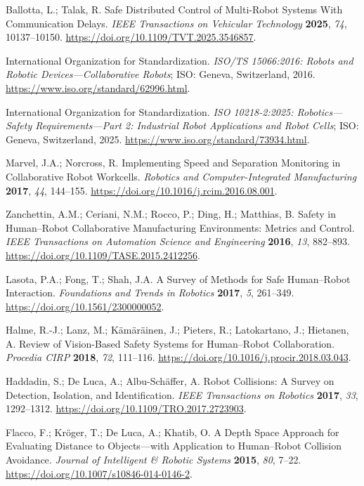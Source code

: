  Ballotta, L.; Talak, R. Safe Distributed Control of Multi-Robot Systems With Communication Delays. \emph{IEEE Transactions on Vehicular Technology} \textbf{2025}, \emph{74}, 10137--10150. \url{https://doi.org/10.1109/TVT.2025.3546857}.

 International Organization for Standardization. \emph{ISO/TS 15066:2016: Robots and Robotic Devices---Collaborative Robots}; ISO: Geneva, Switzerland, 2016. \url{https://www.iso.org/standard/62996.html}.

 International Organization for Standardization. \emph{ISO 10218-2:2025: Robotics---Safety Requirements---Part 2: Industrial Robot Applications and Robot Cells}; ISO: Geneva, Switzerland, 2025. \url{https://www.iso.org/standard/73934.html}.

 Marvel, J.A.; Norcross, R. Implementing Speed and Separation Monitoring in Collaborative Robot Workcells. \emph{Robotics and Computer-Integrated Manufacturing} \textbf{2017}, \emph{44}, 144--155. \url{https://doi.org/10.1016/j.rcim.2016.08.001}.

 Zanchettin, A.M.; Ceriani, N.M.; Rocco, P.; Ding, H.; Matthias, B. Safety in Human--Robot Collaborative Manufacturing Environments: Metrics and Control. \emph{IEEE Transactions on Automation Science and Engineering} \textbf{2016}, \emph{13}, 882--893. \url{https://doi.org/10.1109/TASE.2015.2412256}.

 Lasota, P.A.; Fong, T.; Shah, J.A. A Survey of Methods for Safe Human--Robot Interaction. \emph{Foundations and Trends in Robotics} \textbf{2017}, \emph{5}, 261--349. \url{https://doi.org/10.1561/2300000052}.

 Halme, R.-J.; Lanz, M.; K\"am\"ar\"ainen, J.; Pieters, R.; Latokartano, J.; Hietanen, A. Review of Vision-Based Safety Systems for Human--Robot Collaboration. \emph{Procedia CIRP} \textbf{2018}, \emph{72}, 111--116. \url{https://doi.org/10.1016/j.procir.2018.03.043}.

 Haddadin, S.; De Luca, A.; Albu-Sch\"affer, A. Robot Collisions: A Survey on Detection, Isolation, and Identification. \emph{IEEE Transactions on Robotics} \textbf{2017}, \emph{33}, 1292--1312. \url{https://doi.org/10.1109/TRO.2017.2723903}.

 Flacco, F.; Kr\"oger, T.; De Luca, A.; Khatib, O. A Depth Space Approach for Evaluating Distance to Objects---with Application to Human--Robot Collision Avoidance. \emph{Journal of Intelligent \& Robotic Systems} \textbf{2015}, \emph{80}, 7--22. \url{https://doi.org/10.1007/s10846-014-0146-2}.


